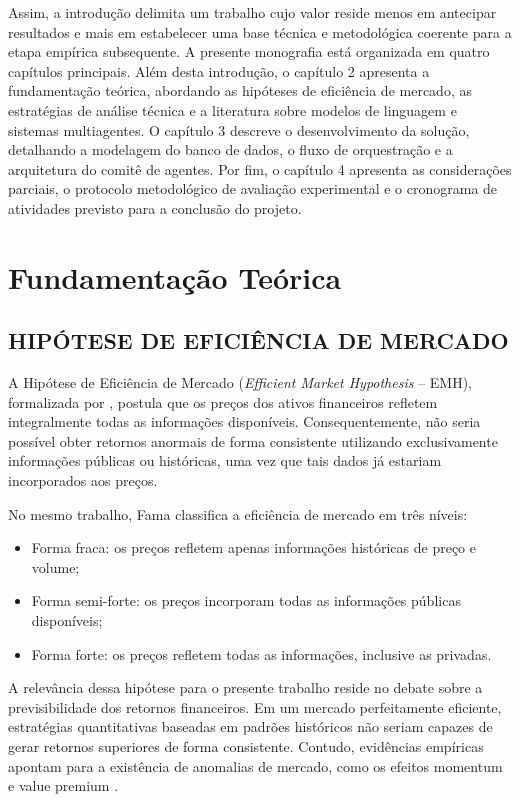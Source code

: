 \documentclass{eic-bcc-tcc}
\begin{document}
Assim, a introdução delimita um trabalho cujo valor reside menos em antecipar resultados e mais em estabelecer uma base técnica e metodológica coerente para a etapa empírica subsequente. A presente monografia está organizada em quatro capítulos principais. Além desta introdução, o capítulo 2 apresenta a fundamentação teórica, abordando as hipóteses de eficiência de mercado, as estratégias de análise técnica e a literatura sobre modelos de linguagem e sistemas multiagentes. O capítulo 3 descreve o desenvolvimento da solução, detalhando a modelagem do banco de dados, o fluxo de orquestração e a arquitetura do comitê de agentes. Por fim, o capítulo 4 apresenta as considerações parciais, o protocolo metodológico de avaliação experimental e o cronograma de atividades previsto para a conclusão do projeto.


\chapter{Fundamentação Teórica}
\label{cha:fundamentacao}

\section{HIPÓTESE DE EFICIÊNCIA DE MERCADO}

A Hipótese de Eficiência de Mercado (\textit{Efficient Market Hypothesis} -- EMH), formalizada por \citep{Fama1970}, postula que os preços dos ativos financeiros refletem integralmente todas as informações disponíveis. Consequentemente, não seria possível obter retornos anormais de forma consistente utilizando exclusivamente informações públicas ou históricas, uma vez que tais dados já estariam incorporados aos preços.

No mesmo trabalho, Fama classifica a eficiência de mercado em três níveis:

\begin{itemize}
\item Forma fraca: os preços refletem apenas informações históricas de preço e volume;
\item Forma semi-forte: os preços incorporam todas as informações públicas disponíveis;
\item Forma forte: os preços refletem todas as informações, inclusive as privadas.
\end{itemize}

A relevância dessa hipótese para o presente trabalho reside no debate sobre a previsibilidade dos retornos financeiros. Em um mercado perfeitamente eficiente, estratégias quantitativas baseadas em padrões históricos não seriam capazes de gerar retornos superiores de forma consistente. Contudo, evidências empíricas apontam para a existência de anomalias de mercado, como os efeitos momentum e value premium \citep{FamaFrench1992, JegadeeshTitman1993}.
\end{document}
